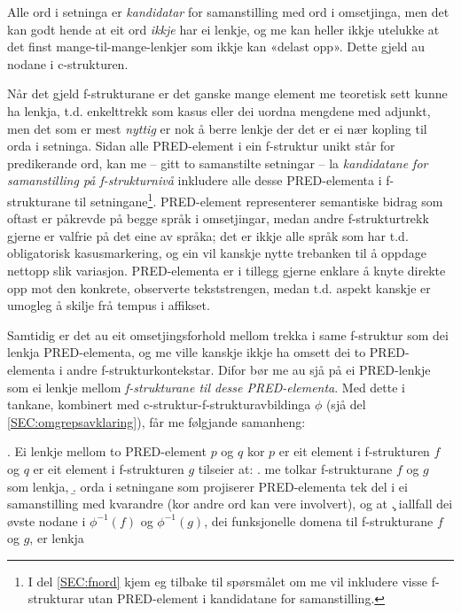 \documentclass[11pt,a4paper,oneside,draft]{book}
\begin{document}
Alle ord i setninga er \emph{kandidatar} for samanstilling med ord i
omsetjinga, men det kan godt hende at eit ord \emph{ikkje} har ei lenkje,
og me kan heller ikkje utelukke at det finst mange-til-mange-lenkjer
som ikkje kan «delast opp». Dette gjeld au nodane i c-strukturen.

Når det gjeld f-strukturane er det ganske mange element me teoretisk
sett kunne ha lenkja, t.d. enkelttrekk som kasus eller dei uordna
mengdene med adjunkt, men det som er mest \emph{nyttig} er nok å berre
lenkje der det er ei nær kopling til orda i setninga. Sidan alle
PRED-element i ein f-struktur unikt står for predikerande ord, kan me
-- gitt to samanstilte setningar -- la \emph{kandidatane for
samanstilling på f-strukturnivå} inkludere alle desse PRED-elementa i
f-strukturane til setningane\footnote{I del \ref{SEC:fnord} kjem eg tilbake til spørsmålet om me vil
        inkludere visse f-strukturar utan PRED-element i kandidatane
        for samanstilling. }. PRED-element representerer
semantiske bidrag som oftast er påkrevde på begge språk i omsetjingar,
medan andre f-strukturtrekk gjerne er valfrie på det eine av språka;
det er ikkje alle språk som har t.d. obligatorisk kasusmarkering, og
ein vil kanskje nytte trebanken til å oppdage nettopp slik variasjon.
 PRED-elementa er i tillegg
gjerne enklare å knyte direkte opp mot den konkrete, observerte
tekststrengen, medan t.d. aspekt kanskje er umogleg å skilje frå
tempus i affikset.

Samtidig er det au eit omsetjingsforhold mellom trekka i same
f-struktur som dei lenkja PRED-elementa, og me ville kanskje ikkje ha
omsett dei to PRED-elementa i andre f-strukturkontekstar. Difor bør me
au sjå på ei PRED-lenkje som ei lenkje mellom \emph{f-strukturane til desse PRED-elementa}. Med dette i tankane, kombinert med
c-struktur-f-strukturavbildinga $\phi$ (sjå del
\ref{SEC:omgrepsavklaring}), får me følgjande samanheng:

\ex. \label{f-links} Ei lenkje mellom to PRED-element $p$ og $q$ kor
      $p$ er eit element i f-strukturen $f$ og $q$ er eit element i
      f-strukturen $g$ tilseier at:
\a. \label{f-links-substr} me tolkar f-strukturane $f$ og $g$ som lenkja,
\b. \label{f-links-words} orda i setningane som projiserer
     PRED-elementa tek del i ei samanstilling med kvarandre (kor andre
     ord kan vere involvert), og at
\c. \label{f-links-domain} iallfall dei øvste nodane i $\phi^{-1}(f)$
     og $\phi^{-1}(g)$, dei funksjonelle domena til f-strukturane $f$
     og $g$, er lenkja 
\end{document}
